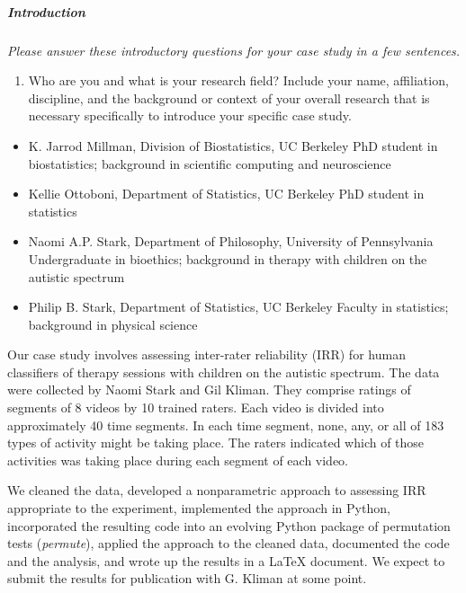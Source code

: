 \documentclass[]{article}
\date{}
\begin{document}
\subparagraph{Introduction}\label{introduction}

\emph{Please answer these introductory questions for your case study in
a few sentences.}

\begin{enumerate}
\def\labelenumi{\arabic{enumi})}
\itemsep1pt\parskip0pt
\item
  Who are you and what is your research field? Include your name,
  affiliation, discipline, and the background or context of your overall
  research that is necessary specifically to introduce your specific
  case study.
\end{enumerate}

\begin{itemize}
\itemsep1pt\parskip0pt
\item
  K. Jarrod Millman, Division of Biostatistics, UC Berkeley PhD student
  in biostatistics; background in scientific computing and neuroscience
\item
  Kellie Ottoboni, Department of Statistics, UC Berkeley PhD student in
  statistics
\item
  Naomi A.P. Stark, Department of Philosophy, University of Pennsylvania
  Undergraduate in bioethics; background in therapy with children on the
  autistic spectrum
\item
  Philip B. Stark, Department of Statistics, UC Berkeley Faculty in
  statistics; background in physical science
\end{itemize}

Our case study involves assessing inter-rater reliability (IRR) for
human classifiers of therapy sessions with children on the autistic
spectrum. The data were collected by Naomi Stark and Gil Kliman. They
comprise ratings of segments of 8 videos by 10 trained raters. Each
video is divided into approximately 40 time segments. In each time
segment, none, any, or all of 183 types of activity might be taking
place. The raters indicated which of those activities was taking place
during each segment of each video.

We cleaned the data, developed a nonparametric approach to assessing IRR
appropriate to the experiment, implemented the approach in Python,
incorporated the resulting code into an evolving Python package of
permutation tests (\emph{permute}), applied the approach to the cleaned
data, documented the code and the analysis, and wrote up the results in
a LaTeX document. We expect to submit the results for publication with
G. Kliman at some point.
\end{document}
